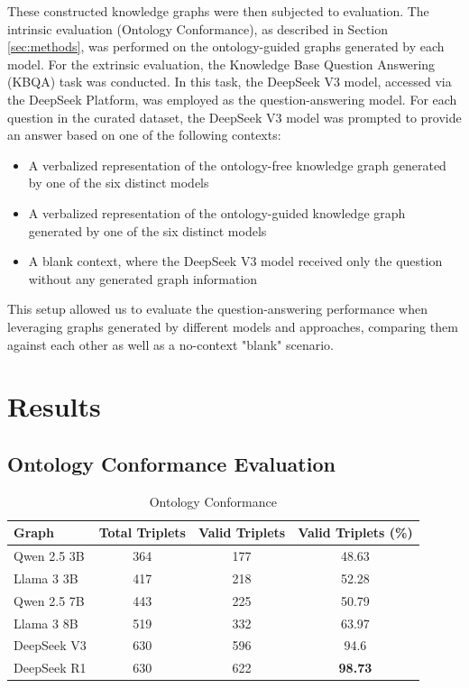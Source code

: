 \documentclass[a4, conference]{IEEEtran}
\begin{document}
These constructed knowledge graphs were then subjected to evaluation. The intrinsic evaluation (Ontology Conformance), as described in Section \ref{sec:methods}, was performed on the ontology-guided graphs generated by each model. For the extrinsic evaluation, the Knowledge Base Question Answering (KBQA) task was conducted. In this task, the DeepSeek V3 model, accessed via the DeepSeek Platform, was employed as the question-answering model. For each question in the curated dataset, the DeepSeek V3 model was prompted to provide an answer based on one of the following contexts:
\begin{itemize}
    \item A verbalized representation of the ontology-free knowledge graph generated by one of the six distinct models
    \item A verbalized representation of the ontology-guided knowledge graph generated by one of the six distinct models
    \item A blank context, where the DeepSeek V3 model received only the question without any generated graph information
\end{itemize}

This setup allowed us to evaluate the question-answering performance when leveraging graphs generated by different models and approaches, comparing them against each other as well as a no-context "blank" scenario.

\section{Results}

\subsection{Ontology Conformance Evaluation}

\begin{table}[h]
    \centering
    \caption{Ontology Conformance}
    \label{tab:oc_percent}
    \begin{tabular}{|l|c|c|c|}
        \hline
        Graph       & Total Triplets & Valid Triplets & Valid Triplets (\%) \\
        \hline
        Qwen 2.5 3B & 364            & 177            & 48.63               \\
        \hline
        Llama 3 3B  & 417            & 218            & 52.28               \\
        \hline
        Qwen 2.5 7B & 443            & 225            & 50.79               \\
        \hline
        Llama 3 8B  & 519            & 332            & 63.97               \\
        \hline
        DeepSeek V3 & 630            & 596            & 94.6                \\
        \hline
        DeepSeek R1 & 630            & 622            & \textbf{98.73}      \\
        \hline
    \end{tabular}
\end{table}
\end{document}
